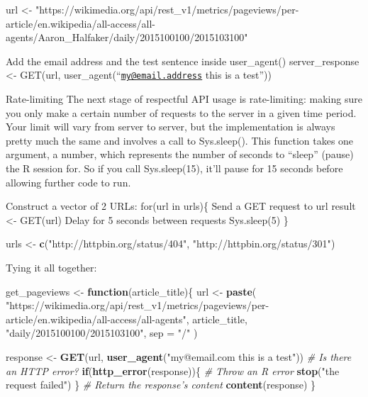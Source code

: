 \documentclass[]{book}
\newenvironment{Shaded}{\begin{snugshade}}{\end{snugshade}}
\newcommand{\CommentTok}[1]{\textcolor[rgb]{0.56,0.35,0.01}{\textit{#1}}}
\newcommand{\ControlFlowTok}[1]{\textcolor[rgb]{0.13,0.29,0.53}{\textbf{#1}}}
\newcommand{\DataTypeTok}[1]{\textcolor[rgb]{0.13,0.29,0.53}{#1}}
\newcommand{\KeywordTok}[1]{\textcolor[rgb]{0.13,0.29,0.53}{\textbf{#1}}}
\newcommand{\NormalTok}[1]{#1}
\newcommand{\StringTok}[1]{\textcolor[rgb]{0.31,0.60,0.02}{#1}}
\begin{document}
\begin{Shaded}
\begin{Highlighting}[]
\NormalTok{url <-}\StringTok{ "https://wikimedia.org/api/rest_v1/metrics/pageviews/per-article/en.wikipedia/all-access/all-agents/Aaron_Halfaker/daily/2015100100/2015103100"}
\end{Highlighting}
\end{Shaded}

Add the email address and the test sentence inside user\_agent()
server\_response \textless{}- GET(url, user\_agent(``\href{mailto:my@email.address}{\nolinkurl{my@email.address}} this is a test''))

Rate-limiting
The next stage of respectful API usage is rate-limiting: making sure you only make a certain number of requests to the server in a given time period.
Your limit will vary from server to server, but the implementation is always pretty much the same and involves a call to Sys.sleep().
This function takes one argument, a number, which represents the number of seconds to ``sleep'' (pause) the R session for.
So if you call Sys.sleep(15), it'll pause for 15 seconds before allowing further code to run.

Construct a vector of 2 URLs:
for(url in urls)\{
Send a GET request to url
result \textless{}- GET(url)
Delay for 5 seconds between requests
Sys.sleep(5)
\}

\begin{Shaded}
\begin{Highlighting}[]
\NormalTok{urls <-}\StringTok{ }\KeywordTok{c}\NormalTok{(}\StringTok{"http://httpbin.org/status/404"}\NormalTok{,}
          \StringTok{"http://httpbin.org/status/301"}\NormalTok{)}
\end{Highlighting}
\end{Shaded}

Tying it all together:

\begin{Shaded}
\begin{Highlighting}[]
\NormalTok{get_pageviews <-}\StringTok{ }\ControlFlowTok{function}\NormalTok{(article_title)\{}
\NormalTok{  url <-}\StringTok{ }\KeywordTok{paste}\NormalTok{(}
    \StringTok{"https://wikimedia.org/api/rest_v1/metrics/pageviews/per-article/en.wikipedia/all-access/all-agents"}\NormalTok{, }
\NormalTok{    article_title, }
    \StringTok{"daily/2015100100/2015103100"}\NormalTok{, }
    \DataTypeTok{sep =} \StringTok{"/"}
\NormalTok{  )   }

\NormalTok{response <-}\StringTok{ }\KeywordTok{GET}\NormalTok{(url, }\KeywordTok{user_agent}\NormalTok{(}\StringTok{"my@email.com this is a test"}\NormalTok{)) }
  \CommentTok{# Is there an HTTP error?}
  \ControlFlowTok{if}\NormalTok{(}\KeywordTok{http_error}\NormalTok{(response))\{ }
    \CommentTok{# Throw an R error}
    \KeywordTok{stop}\NormalTok{(}\StringTok{"the request failed"}\NormalTok{) }
\NormalTok{  \}}
  \CommentTok{# Return the response's content}
  \KeywordTok{content}\NormalTok{(response)}
\NormalTok{\}}
\end{Highlighting}
\end{Shaded}
\end{document}
